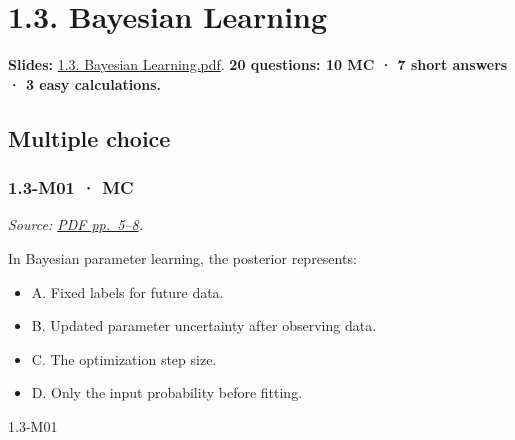 \clearpage

\section{1.3. Bayesian Learning}\label{bayesian-learning}

\textbf{Slides:}
\href{../Lecture\%20Slides/1.3.\%20Bayesian\%20Learning.pdf}{1.3.
Bayesian Learning.pdf}. \textbf{20 questions: 10 MC · 7 short answers ·
3 easy calculations.}

\subsection{Multiple choice}\label{multiple-choice-2}

\noindent\begin{minipage}{\linewidth}

\subsubsection{1.3-M01 · MC}\label{m01-mc-2}

\emph{Source:
\href{../Lecture\%20Slides/1.3.\%20Bayesian\%20Learning.pdf\#page=5}{PDF
pp.~5--8}.}

In Bayesian parameter learning, the posterior represents:

\begin{itemize}
\tightlist
\item
  A. Fixed labels for future data.
\item
  B. Updated parameter uncertainty after observing data.
\item
  C. The optimization step size.
\item
  D. Only the input probability before fitting.
\end{itemize}

\begin{solution}[8mm]{1.3-M01}

\end{solution}
\end{minipage}\par\medskip

